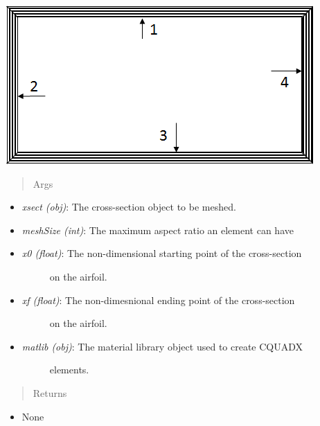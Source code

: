 \documentclass[letterpaper,10pt,english]{sphinxmanual}
\begin{document}
\begin{fulllineitems}
\begin{fulllineitems}
{\hfill\includegraphics{rectBoxGeom.png}\hfill}
\begin{quote}\begin{description}
\item[{Args}] \leavevmode
\end{description}\end{quote}
\begin{itemize}
\item {} 
\emph{xsect (obj)}: The cross-section object to be meshed.

\item {} 
\emph{meshSize (int)}: The maximum aspect ratio an element can have

\item {} \begin{description}
\item[{\emph{x0 (float)}: The non-dimensional starting point of the cross-section}] \leavevmode
on the airfoil.

\end{description}

\item {} \begin{description}
\item[{\emph{xf (float)}: The non-dimesnional ending point of the cross-section}] \leavevmode
on the airfoil.

\end{description}

\item {} \begin{description}
\item[{\emph{matlib (obj)}: The material library object used to create CQUADX}] \leavevmode
elements.

\end{description}

\end{itemize}
\begin{quote}\begin{description}
\item[{Returns}] \leavevmode
\end{description}\end{quote}
\begin{itemize}
\item {} 
None

\end{itemize}

\end{fulllineitems}


\end{fulllineitems}
\end{document}
